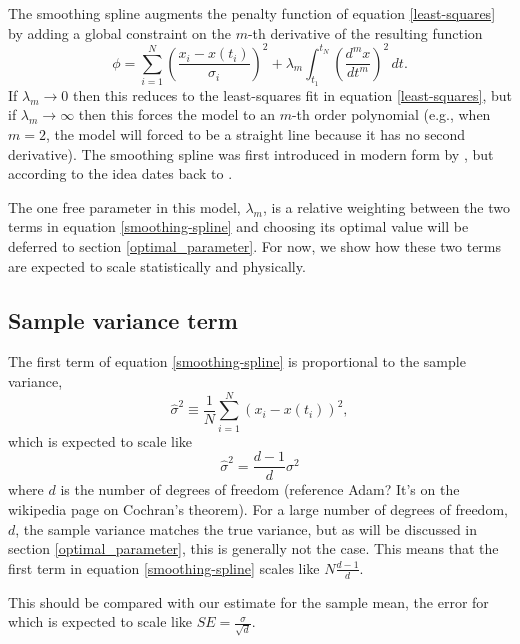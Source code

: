 \documentclass[twocol]{ametsoc}
\begin{document}
The smoothing spline augments the penalty function of equation \ref{least-squares} by adding a global constraint on the $m$-th derivative of the resulting function
\begin{equation}
\label{smoothing-spline}
\phi =  \sum_{i=1}^{N} \left( \frac{x_i - x(t_i)}{\sigma_i} \right) ^2 + \lambda_m \int_{t_1}^{t_N} \left(\frac{d^m x}{dt^m}\right)^2 \, dt.
\end{equation}
If $\lambda_m \rightarrow 0$ then this reduces to the least-squares fit in equation \ref{least-squares}, but if $\lambda_m \rightarrow \infty$ then this forces the model to an $m$-th order polynomial (e.g., when $m=2$, the model will forced to be a straight line because it has no second derivative). The smoothing spline was first introduced in modern form by \citet{reinsch1967-nm}, but according to \citet{deboor1978-book} the idea dates back to \citet{whittaker1923-pems}.

The one free parameter in this model, $\lambda_m$, is a relative weighting between the two terms in equation \ref{smoothing-spline} and choosing its optimal value will be deferred to section \ref{optimal_parameter}. For now, we show how these two terms are expected to scale statistically and physically.

\subsection{Sample variance term}

The first term of equation \ref{smoothing-spline} is proportional to the sample variance,
\begin{equation}
\hat{\sigma}^2  \equiv \frac{1}{N} \sum_{i=1}^{N} \left( x_i - x(t_i) \right) ^2,
\end{equation}
which is expected to scale like
\begin{equation}
\label{sample_variance}
\hat{\sigma}^2 = \frac{d-1}{d} \sigma^2
\end{equation}
where $d$ is the number of degrees of freedom (reference Adam? It's on the wikipedia page on Cochran's theorem). For a large number of degrees of freedom, $d$, the sample variance matches the true variance, but as will be discussed in section \ref{optimal_parameter}, this is generally not the case. This means that the first term in equation \ref{smoothing-spline} scales like $N \frac{d-1}{d}$.

This should be compared with our estimate for the sample mean, the error for which is expected to scale like $SE = \frac{\sigma}{\sqrt{d}}$.
\end{document}
